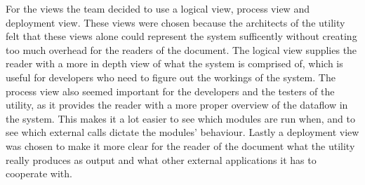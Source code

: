 For the views the team decided to use a logical view, process view and deployment view. These views were chosen because the architects of the \gls{utility} felt that these views alone could represent the system sufficently without creating too much overhead for the readers of the document. The logical view supplies the reader with a more in depth view of what the system is comprised of, which is useful for developers who need to figure out the workings of the system. The process view also seemed important for the developers and the testers of the \gls{utility}, as it provides the reader with a more proper overview of the dataflow in the system. This makes it a lot easier to see which modules are run when, and to see which external calls dictate the modules' behaviour. Lastly a deployment view was chosen to make it more clear for the reader of the document what the \gls{utility} really produces as output and what other external applications it has to cooperate with. 


